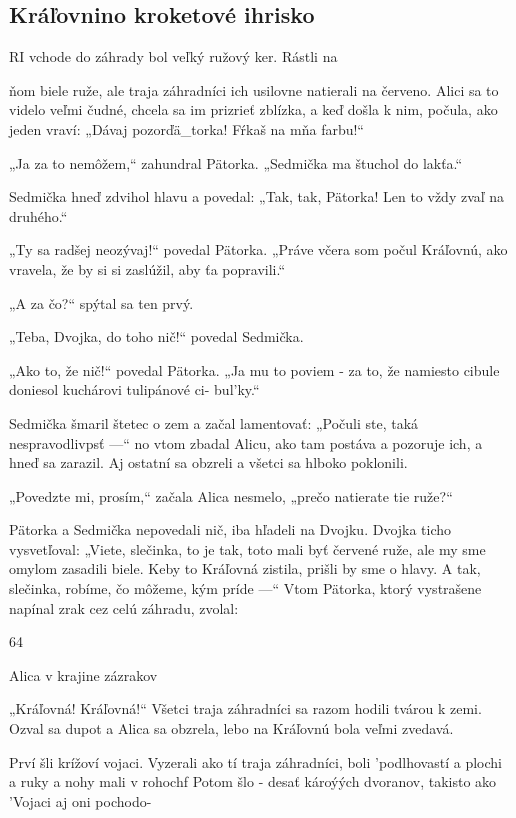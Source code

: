 \documentclass[12pt]{article}
\begin{document}
\begin{Parallel}[p]{}{}
{{%
\section{Kráľovnino kroketové ihrisko}

RI vchode do záhrady bol veľký ružový ker. Rástli na

ňom biele ruže, ale traja záhradníci ich usilovne
natierali na červeno. Alici sa to videlo veľmi čudné, chcela sa
im prizrieť zblízka, a keď došla k nim, počula, ako jeden
vraví: „Dávaj pozorďä_torka! Fŕkaš na mňa farbu!“

„Ja za to nemôžem,“ zahundral Pätorka. „Sedmička ma
štuchol do lakťa.“

Sedmička hneď zdvihol hlavu a povedal: „Tak, tak,
Pätorka! Len to vždy zvaľ na druhého.“

„Ty sa radšej neozývaj!“ povedal Pätorka. „Práve včera
som počul Kráľovnú, ako vravela, že by si si zaslúžil, aby ťa
popravili.“

„A za čo?“ spýtal sa ten prvý.

„Teba, Dvojka, do toho nič!“ povedal Sedmička.

„Ako to, že nič!“ povedal Pätorka. „Ja mu to poviem - za
to, že namiesto cibule doniesol kuchárovi tulipánové ci-
bul'ky.“

Sedmička šmaril štetec o zem a začal lamentovať: „Počuli
ste, taká nespravodlivpsť —“ no vtom zbadal Alicu, ako tam
postáva a pozoruje ich, a hneď sa zarazil. Aj ostatní sa
obzreli a všetci sa hlboko poklonili.

„Povedzte mi, prosím,“ začala Alica nesmelo, „prečo
natierate tie ruže?“

Pätorka a Sedmička nepovedali nič, iba hľadeli na
Dvojku. Dvojka ticho vysvetľoval: „Viete, slečinka, to je
tak, toto mali byť červené ruže, ale my sme omylom zasadili
biele. Keby to Kráľovná zistila, prišli by sme o hlavy. A tak,
slečinka, robíme, čo môžeme, kým príde —“ Vtom Pätorka,
ktorý vystrašene napínal zrak cez celú záhradu, zvolal:

64

Alica v krajine zázrakov

„Kráľovná! Kráľovná!“ Všetci traja záhradníci sa razom
hodili tvárou k zemi. Ozval sa dupot a Alica sa obzrela, lebo
na Kráľovnú bola veľmi zvedavá.

Prví šli krížoví vojaci. Vyzerali ako tí traja záhradníci, boli
'podlhovastí a plochi a ruky a nohy mali v rohochf Potom šlo
- desať károýých dvoranov, takisto ako 'Vojaci aj oni pochodo-

}}
\end{Parallel}
\end{document}
